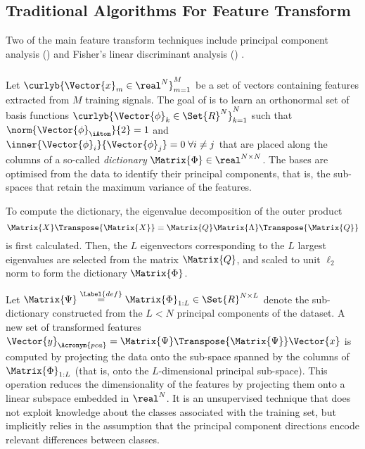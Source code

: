 \documentclass{article}
\def \nComponents{L} 	%
\def \fea{\Vector{x}} 	%
\def \iFea{n}	 		%
\def \nDim{N} 			%
\def \newFea{\Vector{y}} 	%
\def \Dic{\Matrix{\Phi}} %
\def \iAto{k} 			%
\def \atom{\Vector{\phi}}%
\def \nFea{M}			%
\def \iFea{m}			%
\def \definition{\overset{\Label{def}}{=}}	%
\def \ambient{\Set{R}} 						%
\def \Spa{\Matrix{\Psi}}
\begin{document}
\subsection{Traditional Algorithms For Feature Transform}\label{sec:aft}
Two of the main feature transform techniques include principal component analysis () \cite{Pearson1901On} and Fisher's linear discriminant analysis () \cite{Duda1973Pa}.

\subsubsection{}

Let $\curlyb{\fea_{\iFea} \in \real^{\nDim}}_{\iFea=1}^{\nFea}$ be a set of vectors containing features extracted from $\nFea$ training signals. The goal of  is to learn an orthonormal set of basis functions $\curlyb{\atom_{\iAto} \in \ambient^{\nDim}}_{\iAto=1}^{\nDim}$ such that $ \norm{\atom_{\iAtom}}{2}=1$ and $\inner{\atom_{i}}{\atom_{j}}=0 \; \forall i\neq j$ that are placed along the columns of a so-called \emph{dictionary} $\Dic\in\real^{\nDim\times\nDim}$. The bases are optimised from the data to identify their principal components, that is, the sub-spaces that retain the maximum variance of the features.

To compute the dictionary, the eigenvalue decomposition of the outer product
\begin{equation}
\Matrix{X}\Transpose{\Matrix{X}} = \Matrix{Q}\Matrix{\Lambda}\Transpose{\Matrix{Q}}
\end{equation}
is first calculated. Then, the $\nComponents$ eigenvectors corresponding to the $\nComponents$ largest eigenvalues are selected from the matrix $\Matrix{Q}$, and scaled to unit $\ell_{2}$ norm to form the dictionary $\Dic$.

Let $\Spa\definition\Dic_{1:\nComponents}\in\ambient^{\nDim\times\nComponents}$ denote the sub-dictionary constructed from the $\nComponents<\nDim$ principal components of the dataset. A new set of transformed features $\newFea_{\Acronym{pca}} = \Spa\Transpose{\Spa}\fea$ is computed by projecting the data onto the sub-space spanned by the columns of $\Dic_{1:\nComponents}$ (that is, onto the $\nComponents$-dimensional principal sub-space). This operation reduces the dimensionality of the features by projecting them onto a linear subspace embedded in $\real^{\nDim}$. It is an unsupervised technique that does not exploit knowledge about the classes associated with the training set, but implicitly relies in the assumption that the principal component directions encode relevant differences between classes.
\end{document}
